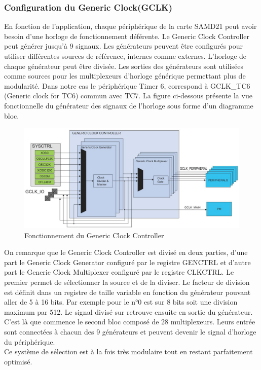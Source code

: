 \documentclass[a4paper]{article}
\begin{document}
	\subsubsection{Configuration du Generic Clock(GCLK)} 
	En fonction de l'application, chaque périphérique de la carte SAMD21 peut avoir besoin d'une horloge de fonctionnement déférente. Le Generic Clock Controller peut générer jusqu'à 9 signaux. Les générateurs peuvent être configurés pour utiliser différentes sources de référence, internes comme externes. L'horloge de chaque générateur peut être divisée. Les sorties des générateurs sont utilisées comme sources pour les multiplexeurs d'horloge générique permettant plus de modularité. Dans notre cas le périphérique Timer 6, correspond à GCLK\_TC6 (Generic clock for TC6) commun avec TC7. La figure ci-dessous présente la vue fonctionnelle du générateur des signaux de l'horloge sous forme d'un diagramme bloc. \\
	\begin{figure}[H]
		\centering
		\includegraphics[width=\linewidth]{GENCLK_bloc.jpg}
		\caption{Fonctionnement du Generic Clock Controller}
	\end{figure}
	On remarque que le Generic Clock Controller est divisé en deux parties, d'une part le Generic Clock Generator configuré par le registre GENCTRL et d'autre part le Generic Clock Multiplexer configuré par le registre CLKCTRL. Le premier permet de sélectionner la source et de la diviser. Le facteur de division est définit dans un registre de taille variable en fonction du générateur pouvant aller de 5 à 16 bits. Par exemple pour le n°0 est sur 8 bits soit une division maximum par 512. Le signal divisé sur retrouve ensuite en sortie du générateur. C'est là que commence le second bloc composé de 28 multiplexeurs. Leurs entrée sont connectées à chacun des 9 générateurs et peuvent devenir le signal d'horloge du périphérique. \\ 
	Ce système de sélection est à la fois très modulaire tout en restant parfaitement optimisé. 
	
\end{document}
